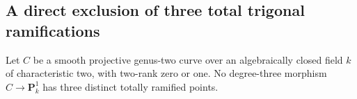 \subsection{A direct exclusion of three total trigonal ramifications}

\begin{lemma}
\label{lem:root-nonordinary-trigonal-three-excluded-candidate}
Let $C$ be a smooth projective genus-two curve over an algebraically
closed field $k$ of characteristic two, with two-rank zero or one.
No degree-three morphism $C\to\mathbf P^1_k$ has three distinct
totally ramified points.
\end{lemma}
